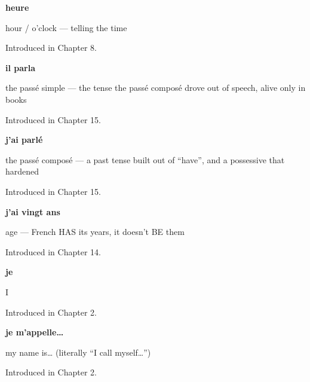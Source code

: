 \noindent\begin{minipage}[t]{\linewidth}
\raggedright
\textbf{heure}\par
\small hour / o'clock — telling the time\par
\footnotesize Introduced in Chapter 8.
\end{minipage}\par\medskip

\noindent\begin{minipage}[t]{\linewidth}
\raggedright
\textbf{il parla}\par
\small the passé simple — the tense the passé composé drove out of speech, alive only in books\par
\footnotesize Introduced in Chapter 15.
\end{minipage}\par\medskip

\noindent\begin{minipage}[t]{\linewidth}
\raggedright
\textbf{j'ai parlé}\par
\small the passé composé — a past tense built out of \textquotedblleft{}have\textquotedblright{}, and a possessive that hardened\par
\footnotesize Introduced in Chapter 15.
\end{minipage}\par\medskip

\noindent\begin{minipage}[t]{\linewidth}
\raggedright
\textbf{j'ai vingt ans}\par
\small age — French HAS its years, it doesn't BE them\par
\footnotesize Introduced in Chapter 14.
\end{minipage}\par\medskip

\noindent\begin{minipage}[t]{\linewidth}
\raggedright
\textbf{je}\par
\small I\par
\footnotesize Introduced in Chapter 2.
\end{minipage}\par\medskip

\noindent\begin{minipage}[t]{\linewidth}
\raggedright
\textbf{je m'appelle…}\par
\small my name is… (literally \textquotedblleft{}I call myself…\textquotedblright{})\par
\footnotesize Introduced in Chapter 2.
\end{minipage}\par\medskip

